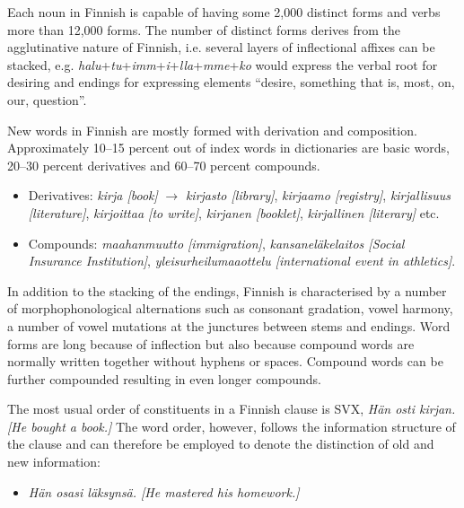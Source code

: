 \documentclass[]{../../metanetpaper}
\begin{document}
\begin{Parallel}[c]{77mm}{77mm}
{Each noun in Finnish is capable of having some 2,000 distinct forms
and verbs more than 12,000 forms. The number of distinct forms derives
from the agglutinative nature of Finnish, i.e. several layers of
inflectional affixes can be stacked,
e.g. \textit{halu}+\textit{tu}+\textit{imm}+\textit{i}+\textit{lla}+\textit{mme}+\textit{ko}
would express the verbal root for desiring and endings for expressing
elements “desire, something that is, most, on, our, question”.

New words in Finnish are mostly formed with derivation and composition.
Approximately 10–15 percent out of index words in dictionaries are basic words,
20–30 percent derivatives and 60–70 percent compounds.
\begin{itemize}
\item Derivatives:
   \textit{\foreignlanguage{finnish}{\textit{kirja}} [book]} $\to$
   \textit{\foreignlanguage{finnish}{\textit{kirjasto}} [library]},
   \textit{\foreignlanguage{finnish}{\textit{kirjaamo}} [registry]},
   \textit{\foreignlanguage{finnish}{\textit{kirjallisuus}} [literature]},
   \textit{\foreignlanguage{finnish}{\textit{kirjoittaa}} [to write]},
   \textit{\foreignlanguage{finnish}{\textit{kirjanen}} [booklet]},
   \textit{\foreignlanguage{finnish}{\textit{kirjallinen}} [literary]} etc.

\item Compounds:
   \textit{\foreignlanguage{finnish}{\textit{maahanmuutto}} [immigration]},
   \textit{\foreignlanguage{finnish}{\textit{kansaneläkelaitos}}
           [Social Insurance Institution]},
   \textit{\foreignlanguage{finnish}{\textit{yleisurheilumaaottelu}}
           [international event in athletics]}.
\end{itemize}

In addition to the stacking of the endings, Finnish is characterised by a
number of morphophonological alternations such as consonant gradation, vowel
harmony, a number of vowel mutations at the junctures between stems and
endings. Word forms are long because of inflection but also because compound
words are normally written together without hyphens or spaces. Compound words
can be further compounded resulting in even longer compounds.

The most usual order of constituents in a Finnish clause is SVX,
\textit{\foreignlanguage{finnish}{\textit{Hän osti kirjan.}}
        [He bought a book.]}
The word order, however, follows the
information structure of the clause and can therefore be employed to denote the
distinction of old and new information:
\begin{itemize}
\item \textit{\foreignlanguage{finnish}{\textit{Hän osasi läksynsä.}}
              [He mastered his homework.]}


\end{itemize}}
\end{Parallel}
\end{document}
